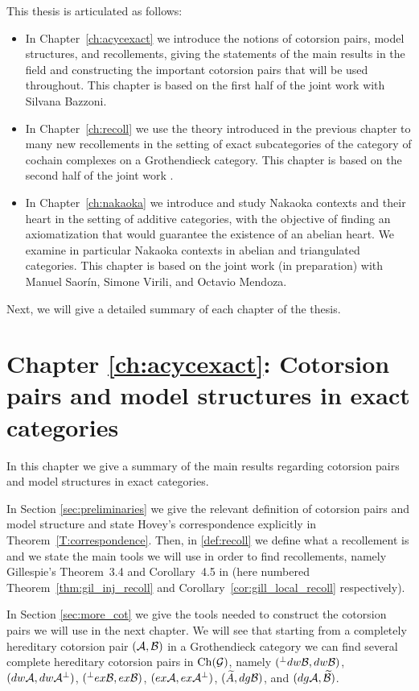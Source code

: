 This thesis is articulated as follows:
\begin{itemize}
  \item In Chapter~\ref{ch:acycexact} we introduce the notions of cotorsion pairs, model structures, and recollements, giving the statements of the main results in the field and constructing the important cotorsion pairs that will be used throughout. This chapter is based on the first half of the joint work \cite{bazzoni2018recollements} with Silvana Bazzoni.
  \item In Chapter~\ref{ch:recoll} we use the theory introduced in the previous chapter to many new recollements in the setting of exact subcategories of the category of cochain complexes on a Grothendieck category. This chapter is based on the second half of the joint work \cite{bazzoni2018recollements}.
  \item In Chapter~\ref{ch:nakaoka} we introduce and study Nakaoka contexts and their heart in the setting of additive categories, with the objective of finding an axiomatization that would guarantee the existence of an abelian heart. We examine in particular Nakaoka contexts in abelian and triangulated categories. This chapter is based on the joint work (in preparation) \cite{mstv2018} with Manuel Saor\'in, Simone Virili, and Octavio Mendoza.
\end{itemize}

Next, we will give a detailed summary of each chapter of the thesis.

\section*{Chapter \ref{ch:acycexact}: Cotorsion pairs and model structures in exact categories}

In this chapter we give a summary of the main results regarding cotorsion pairs and model structures in exact categories.

In Section \ref{sec:preliminaries} we give the relevant definition of cotorsion pairs and model structure and state Hovey's correspondence explicitly in Theorem~\ref{T:correspondence}.
Then, in \ref{def:recoll} we define what a recollement is and we state the main tools we will use in order to find recollements, namely Gillespie's Theorem~3.4 and Corollary~4.5 in \cite{G7} (here numbered Theorem~\ref{thm:gil_inj_recoll} and Corollary~\ref{cor:gill_local_recoll} respectively).

In Section \ref{sec:more_cot} we give the tools needed to construct the cotorsion pairs we will use in the next chapter. We will see that starting from a completely hereditary cotorsion pair $(\mathcal{A},\mathcal{B})$ in a Grothendieck category we can find several complete hereditary cotorsion pairs in $\mathrm{Ch}(\mathcal{G})$, namely $({^\perp dw\mathcal{B}},dw \mathcal{B})$, $(dw \mathcal{A},{dw \mathcal{A}^\perp})$, $({^\perp ex\mathcal{B}},ex \mathcal{B})$, $(ex\mathcal{A}, {ex\mathcal{A}^\perp})$, $(\widetilde{A},dg \mathcal{B})$, and $(dg \mathcal{A},\widetilde{\mathcal{B}})$.

